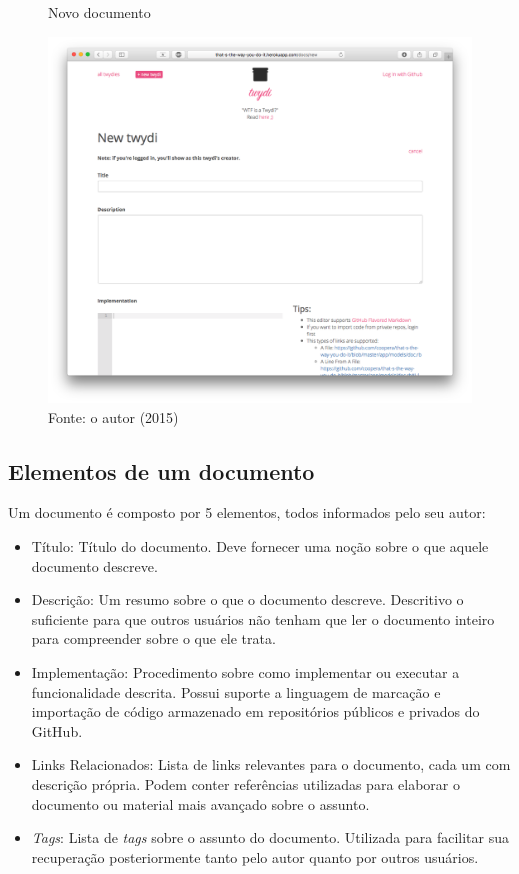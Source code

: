\begin{figure}[h]
	\centering
    \caption{Novo documento}
    \includegraphics[width=15cm]{Imagens/print-new-twydi.png}
	\caption*{Fonte: o autor (2015)}
\end{figure}

\subsection{Elementos de um documento}

Um documento é composto por 5 elementos, todos informados pelo seu autor:

\begin{itemize}
  \item Título: Título do documento. Deve fornecer uma noção sobre o que aquele documento descreve.
  \item Descrição: Um resumo sobre o que o documento descreve. Descritivo o suficiente para que outros usuários não tenham que ler o documento inteiro para compreender sobre o que ele trata.
  \item Implementação: Procedimento sobre como implementar ou executar a funcionalidade descrita. Possui suporte a linguagem de marcação e importação de código armazenado em repositórios públicos e privados do GitHub.
  \item Links Relacionados: Lista de links relevantes para o documento, cada um com descrição própria. Podem conter referências utilizadas para elaborar o documento ou material mais avançado sobre o assunto.
  \item \textit{Tags}: Lista de \textit{tags} sobre o assunto do documento. Utilizada para facilitar sua recuperação posteriormente tanto pelo autor quanto por outros usuários.
\end{itemize}


